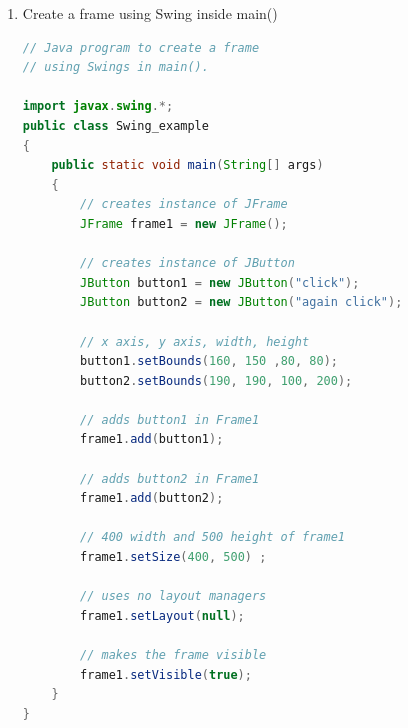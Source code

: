 \documentclass[11pt]{article}
\begin{document}
\begin{enumerate}
\begin{enumerate}
\begin{lstlisting}[language=Java]
		\end{lstlisting}
		      \item Create a frame using Swing inside main()
		            \begin{lstlisting}[language=Java]
// Java program to create a frame
// using Swings in main().

import javax.swing.*;
public class Swing_example
{
	public static void main(String[] args)
	{
		// creates instance of JFrame
		JFrame frame1 = new JFrame();

		// creates instance of JButton
		JButton button1 = new JButton("click");
		JButton button2 = new JButton("again click");

		// x axis, y axis, width, height
		button1.setBounds(160, 150 ,80, 80);
		button2.setBounds(190, 190, 100, 200);

		// adds button1 in Frame1
		frame1.add(button1);
		
		// adds button2 in Frame1
		frame1.add(button2);

		// 400 width and 500 height of frame1
		frame1.setSize(400, 500) ;
		
		// uses no layout managers
		frame1.setLayout(null);
		
		// makes the frame visible
		frame1.setVisible(true);
	}
}

			  \end{lstlisting}
	      \end{enumerate}


\end{enumerate}
\end{document}
